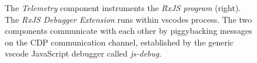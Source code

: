 \begin{figure}
  \caption{The \emph{Telemetry} component instruments the \emph{RxJS program} (right). The \emph{RxJS Debugger Extension} runs within vscodes process. The two components communicate with each other by piggybacking messages on the CDP communication channel, established by the generic vscode JavaScript debugger called \emph{js-debug}.}
  \label{fig:architecture}
\end{figure}
